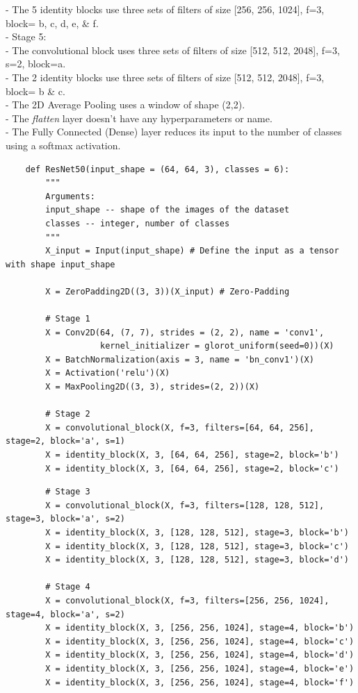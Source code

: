 \documentclass[11pt, a4paper]{article}
\begin{document}
\begin{spacing}{1.1}
	\hspace*{4mm} - The 5 identity blocks use three sets of filters of size [256, 256, 1024], f=3, block= b, c, d, e, \& f.\vspace*{.5mm}\\
	- Stage 5:\\
	\hspace*{4mm} - The convolutional block uses three sets of filters of size [512, 512, 2048], f=3, s=2, block=a.\\
	\hspace*{4mm} - The 2 identity blocks use three sets of filters of size [512, 512, 2048], f=3, block= b \& c.\vspace*{.5mm}\\
	- The 2D Average Pooling uses a window of shape (2,2).\\
	- The \textit{flatten} layer doesn't have any hyperparameters or name.\\
	- The Fully Connected (Dense) layer reduces its input to the number of classes using a softmax activation.
	\begin{lstlisting}
	def ResNet50(input_shape = (64, 64, 3), classes = 6):
		"""
		Arguments:
		input_shape -- shape of the images of the dataset
		classes -- integer, number of classes
		"""
		X_input = Input(input_shape) # Define the input as a tensor with shape input_shape
		
		X = ZeroPadding2D((3, 3))(X_input) # Zero-Padding
		
		# Stage 1
		X = Conv2D(64, (7, 7), strides = (2, 2), name = 'conv1', 
		           kernel_initializer = glorot_uniform(seed=0))(X)
		X = BatchNormalization(axis = 3, name = 'bn_conv1')(X)
		X = Activation('relu')(X)
		X = MaxPooling2D((3, 3), strides=(2, 2))(X)
		
		# Stage 2
		X = convolutional_block(X, f=3, filters=[64, 64, 256], stage=2, block='a', s=1)
		X = identity_block(X, 3, [64, 64, 256], stage=2, block='b')
		X = identity_block(X, 3, [64, 64, 256], stage=2, block='c') \end{lstlisting} \newpage
		
	\begin{lstlisting}
		# Stage 3 
		X = convolutional_block(X, f=3, filters=[128, 128, 512], stage=3, block='a', s=2)
		X = identity_block(X, 3, [128, 128, 512], stage=3, block='b')
		X = identity_block(X, 3, [128, 128, 512], stage=3, block='c')
		X = identity_block(X, 3, [128, 128, 512], stage=3, block='d')
		
		# Stage 4 
		X = convolutional_block(X, f=3, filters=[256, 256, 1024], stage=4, block='a', s=2)
		X = identity_block(X, 3, [256, 256, 1024], stage=4, block='b')
		X = identity_block(X, 3, [256, 256, 1024], stage=4, block='c')
		X = identity_block(X, 3, [256, 256, 1024], stage=4, block='d')
		X = identity_block(X, 3, [256, 256, 1024], stage=4, block='e')
		X = identity_block(X, 3, [256, 256, 1024], stage=4, block='f')
		

\end{lstlisting}
\end{spacing}
\end{document}
